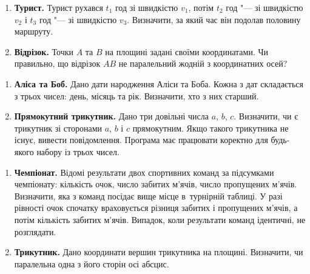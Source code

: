 	
	
	
	{\large
		\begin{enumerate}
			\item \textbf{Турист.} Турист рухався $t_1$ год зі швидкістю $v_1$, потім $t_2$ год "--- зі швидкістю $v_2$ і $t_3$ год "--- зі швидкістю $v_3$. Визначити, за який час він подолав половину маршруту.
			\item \textbf{Відрізок.} Точки $A$ та $B$ на площині задані своїми координатами. Чи правильно, що відрізок $AB$ не паралельний жодній з координатних осей?
		\end{enumerate}
	}
	
	
	
	
	{\large
		\begin{enumerate}
			\item \textbf{Аліса та Боб.} Дано дати народження Аліси та Боба. Кожна з дат складається з трьох чисел: день, місяць та рік. Визначити, хто з них старший.
			\item \textbf{Прямокутний трикутник.} Дано три довільні числа $a$, $b$, $c$. Визначити, чи є трикутник зі сторонами $a$, $b$ і $c$ прямокутним. Якщо такого трикутника не існує, вивести повідомлення. Програма має працювати коректно для будь-якого набору із трьох чисел.
		\end{enumerate}
	}
	
	
	
	
	{\large
		\begin{enumerate}
			\item \textbf{Чемпіонат.} Відомі результати двох спортивних команд за підсумками чемпіонату: кількість очок, число забитих м'ячів, число пропущених м'ячів. Визначити, яка з команд посідає вище місце в~турнірній таблиці. У разі рівності очок спочатку враховується різниця забитих і пропущених м'ячів, а потім кількість забитих м'ячів. Випадок, коли результати команд ідентичні, не розглядати.
			\item \textbf{Трикутник.} Дано координати вершин трикутника на площині. Визначити, чи паралельна одна з його сторін осі абсцис.
		\end{enumerate}
	}
	
	\vspace{1cm}
	
	
